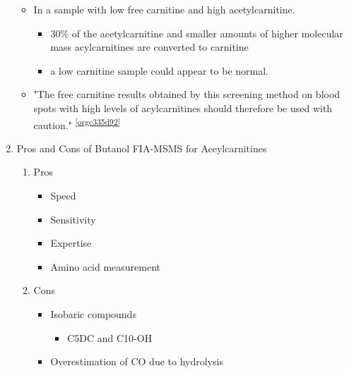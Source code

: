 \documentclass{scrartcl}
\begin{document}
\begin{enumerate}
\begin{itemize}
\item In a sample with low free carnitine and high acetylcarnitine.
\begin{itemize}
\item 30\% of the acetylcarnitine and smaller amounts of higher
molecular mass acylcarnitines are converted to carnitine
\item a low carnitine sample could appear to be normal.
\end{itemize}
\item "The free carnitine results obtained by this screening method on
blood spots with high levels of acylcarnitines should therefore be
used with caution." \textsuperscript{\ref{orgc335d92}}
\end{itemize}
\item Pros and Cons of Butanol  FIA-MSMS for Aceylcarnitines
\label{sec:org117241c}
\begin{enumerate}
\item Pros
\label{sec:orgcdf3d4c}
\begin{itemize}
\item Speed
\item Sensitivity
\item Expertise
\item Amino acid measurement
\end{itemize}
\item Cons
\label{sec:orgb06576f}
\begin{itemize}
\item Isobaric compounds
\begin{itemize}
\item C5DC and C10-OH
\end{itemize}
\item Overestimation of CO due to hydrolysis
\end{itemize}
\end{enumerate}
\end{enumerate}
\end{document}
